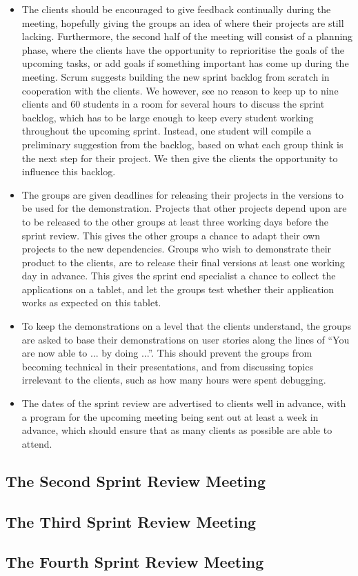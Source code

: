 \begin{itemize}
	\item The clients should be encouraged to give feedback continually during the meeting, hopefully giving the groups an idea of where their projects are still lacking. Furthermore, the second half of the meeting will consist of a planning phase, where the clients have the opportunity to reprioritise the goals of the upcoming tasks, or add goals if something important has come up during the meeting. Scrum suggests building the new 	sprint backlog from scratch in cooperation with the clients. We however, see no reason to keep up to nine clients and 60 students in a room for several hours to discuss the sprint backlog, which has to be large enough to keep every student working throughout the upcoming sprint. Instead, one student will compile a preliminary suggestion from the backlog, based on what each group think is the next step for their project. We then give the clients the opportunity to influence this backlog.
	\item The groups are given deadlines for releasing their projects in the versions to be used for the demonstration. Projects that other projects depend upon are to be released to the other groups at least three working days before the sprint review. This gives the other groups a chance to adapt their own projects to the new dependencies. Groups who wish to demonstrate their product to the clients, are to release their final versions at least one working day in advance. This gives the sprint end specialist a chance to collect the applications on a tablet, and let the groups test whether their application works as expected on this tablet. 
	\item To keep the demonstrations on a level that the clients understand, the groups are asked to base their demonstrations on user stories along the lines of ``You are now able to ... by doing ...''. This should prevent the groups from becoming technical in their presentations, and from discussing topics irrelevant to the clients, such as how many hours were spent debugging. 
	\item The dates of the sprint review are advertised to clients well in advance, with a program for the upcoming meeting being sent out at least a week in advance, which should ensure that as many clients as possible are able to attend. 
\end{itemize}

\subsection{The Second Sprint Review Meeting}
\label{collab:sprintend:two}


\subsection{The Third Sprint Review Meeting}
\label{collab:sprintend:three}


\subsection{The Fourth Sprint Review Meeting}
\label{collab:sprintend:four}



